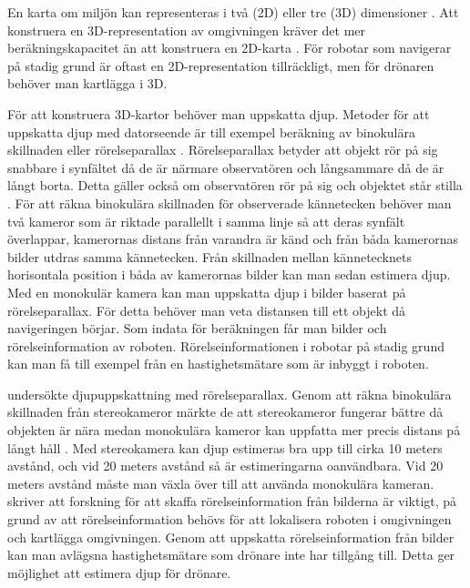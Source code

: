 En karta om miljön kan representeras i två (2D) eller tre (3D) dimensioner \citep{geospatial}. Att konstruera en 3D-representation av omgivningen kräver det mer beräkningskapacitet än att konstruera en 2D-karta \citep{ProbabilisticRobotics}. För robotar som navigerar på stadig grund är oftast en 2D-representation tillräckligt, men för drönaren behöver man kartlägga i 3D. 

För att konstruera 3D-kartor behöver man uppskatta djup. Metoder för att uppskatta djup med datorseende är till exempel beräkning av binokulära skillnaden eller rörelseparallax \citep{suomimainittu}. Rörelseparallax betyder att objekt rör på sig snabbare i synfältet då de är närmare observatören och långsammare då de är långt borta. Detta gäller också om observatören rör på sig och objektet står stilla \citep{suomimainittu, parallax}. För att räkna binokulära skillnaden för observerade kännetecken behöver man två kameror som är riktade parallellt i samma linje så att deras synfält överlappar, kamerornas distans från varandra är känd och från båda kamerornas bilder utdras samma kännetecken. Från skillnaden mellan kännetecknets horisontala position i båda av kamerornas bilder kan man sedan estimera djup. Med en monokulär kamera kan man uppskatta djup i bilder baserat på rörelseparallax. För detta behöver man veta distansen till ett objekt då navigeringen börjar. Som indata för beräkningen får man bilder och rörelseinformation av roboten. Rörelseinformationen i robotar på stadig grund kan man få till exempel från en hastighetsmätare som är inbyggt i roboten.

\cite{suomimainittu} undersökte djupuppskattning med rörelseparallax. Genom att räkna binokulära skillnaden från stereokameror märkte de att stereokameror fungerar bättre då objekten är nära medan monokulära kameror kan uppfatta mer precis distans på långt håll \citep{suomimainittu}. Med stereokamera kan djup estimeras bra upp till cirka 10 meters avstånd, och vid 20 meters avstånd så är estimeringarna oanvändbara. Vid 20 meters avstånd måste man växla över till att använda monokulära kameran. \cite{suomimainittu} skriver att forskning för att skaffa rörelseinformation från bilderna är viktigt, på grund av att rörelseinformation behövs för att lokalisera roboten i omgivningen och kartlägga omgivningen. Genom att uppskatta rörelseinformation från bilder kan man avlägsna hastighetsmätare som drönare inte har tillgång till. Detta ger möjlighet att estimera djup för drönare.

